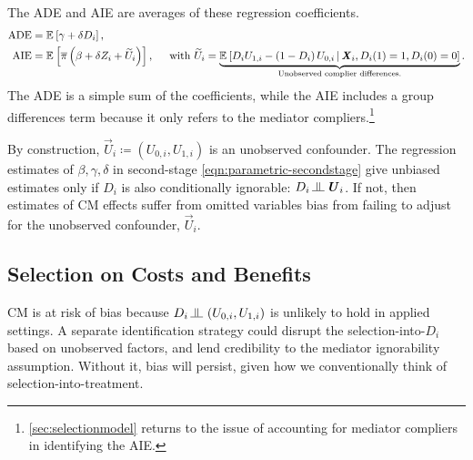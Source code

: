 The ADE and AIE are averages of these regression coefficients.
\begin{align*}
    \text{ADE}
        &= \mathbb{E}_{} \left[ \gamma + \delta D_i \right], \\
    \text{AIE}
        &= \mathbb{E}_{} \left[  \overline{\pi} \left( \beta +  \delta Z_i + \widetilde{U}_i \right) \right],
        \;\;\;\; \text{ with } \widetilde{U}_i
            = \underbrace{\mathbb{E}_{} \left[  D_i U_{1,i} - \left(1 - D_i \right)U_{0,i} \, \middle\vert \, 
                \boldsymbol{\mathit{X}}_i, D_i(1) = 1, D_i(0) = 0 \right]}_{
                    \text{Unobserved complier differences.}}.
\end{align*}
The ADE is a simple sum of the coefficients, while the AIE includes a group differences term because it only refers to the mediator compliers.\footnote{
    \autoref{sec:selectionmodel} returns to the issue of accounting for mediator compliers in identifying the AIE.
}

By construction, $\vec U_i \coloneqq \left(U_{0, i}, U_{1, i} \right)$ is an unobserved confounder.
The regression estimates of $\beta, \gamma, \delta$ in second-stage \eqref{eqn:parametric-secondstage} give unbiased estimates only if $D_i$ is also conditionally ignorable: $D_i \indep  \vec U_{i} $.
If not, then estimates of CM effects suffer from omitted variables bias from failing to adjust for the unobserved confounder, $\vec U_i$.

\subsection{Selection on Costs and Benefits}
CM is at risk of bias because $D_i \indep  \left(U_{0, i}, U_{1, i} \right)$ is unlikely to hold in applied settings.
A separate identification strategy could disrupt the selection-into-$D_i$ based on unobserved factors, and lend credibility to the mediator ignorability assumption.
Without it, bias will persist, given how we conventionally think of selection-into-treatment.

